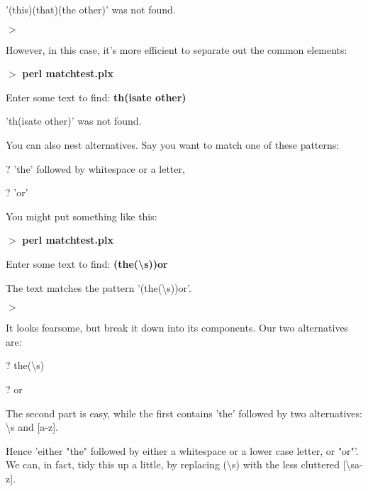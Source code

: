 \documentclass[a4paper,11pt]{book}
\begin{document}
\noindent '(this)\textbar (that)\textbar (the other)' was not found.

\noindent $>$

\noindent 

\noindent However, in this case, it's more efficient to separate out the common elements:

\noindent 

\noindent $>$ \textbf{perl matchtest.plx}

\noindent Enter some text to find: \textbf{th(is\textbar at\textbar e other)}

\noindent 'th(is\textbar at\textbar e other)' was not found.

\noindent 

\noindent You can also nest alternatives. Say you want to match one of these patterns:

\noindent 

\noindent ? 'the' followed by whitespace or a letter,

\noindent 

\noindent ? 'or'

\noindent 

\noindent You might put something like this:

\noindent 

\noindent $>$ \textbf{perl matchtest.plx}

\noindent Enter some text to find: \textbf{(the(\textbackslash s\textbar [a-z]))\textbar or}

\noindent The text matches the pattern '(the(\textbackslash s\textbar [a-z]))\textbar or'.

\noindent $>$

\noindent 

\noindent It looks fearsome, but break it down into its components. Our two alternatives are:

\noindent 

\noindent ? the(\textbackslash s\textbar [a-z])

\noindent 

\noindent ? or

\noindent 

\noindent The second part is easy, while the first contains 'the' followed by two alternatives: \textbackslash s and [a-z].

\noindent Hence 'either "the" followed by either a whitespace or a lower case letter, or "or"'. We can, in fact, tidy this up a little, by replacing (\textbackslash s\textbar [a-z]) with the less cluttered [\textbackslash sa-z].
\end{document}
